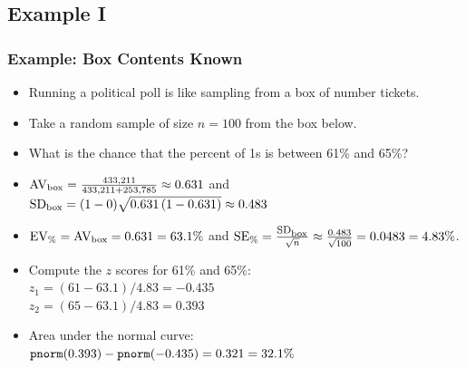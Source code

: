 \documentclass[t]{beamer}
\begin{document}
\subsection{Example I}
\begin{frame}
\frametitle{Example:  Box Contents Known}

\footnotesize

\begin{itemize}
\item Running a political poll is like sampling from a box of number tickets.
\item<2-> Take a random sample of size $n=100$ from the box below.
\begin{center}
\vspace{2pt}
\end{center}
\item<3->  What is the chance that the percent of 1s is between 61\% and 65\%?
\item<4-> $\mbox{AV}_{\mbox{\scriptsize box}}=\frac{433,211}{433,211 + 253,785} \approx 0.631$
and $\mbox{SD}_{\mbox{\scriptsize box}}=(1-0)\sqrt{0.631\,(1-0.631)} \approx 0.483$
\item<5-> $\mbox{EV}_{\mbox{\scriptsize \%}}=\mbox{AV}_{\mbox{\scriptsize box}}=0.631=63.1\%$
 and $\mbox{SE}_{\mbox{\scriptsize \%}}=
    \frac{\footnotesize\mbox{SD}_{\mbox{\scriptsize box}}}{\sqrt{n}}\approx 
    \frac{0.483}{\sqrt{100}} = 0.0483 = 4.83\%$.
\item<6-> Compute the $z$ scores for 61\% and 65\%:\\
   $z_1=(61 - 63.1)/4.83 = -0.435$\\[2pt]
   $z_2=(65 - 63.1)/4.83 = 0.393$\\
\item<7->  Area under the normal curve:~{\scriptsize $\mbox{\texttt{pnorm}}(0.393) - \mbox{\texttt{pnorm}}(-0.435) = 0.321=32.1\%$}
\end{itemize}

\end{frame}
\end{document}
